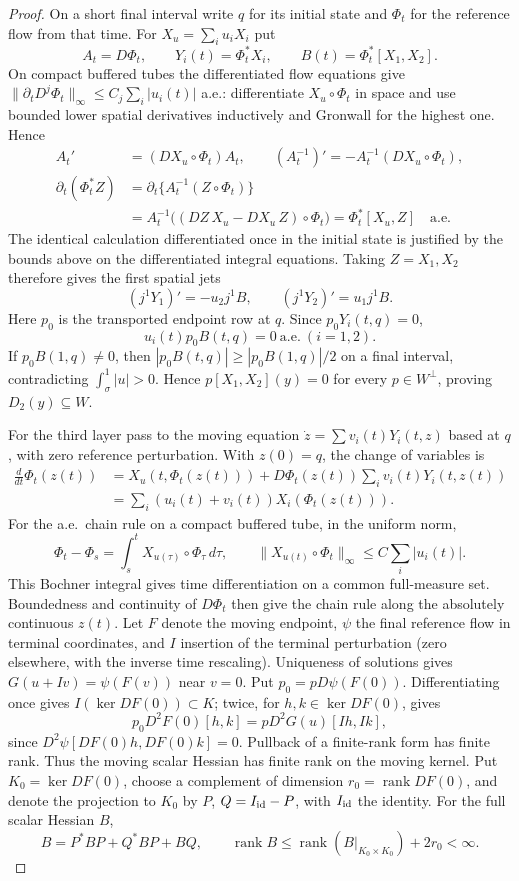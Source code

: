 \documentclass[11pt,letterpaper]{article}
\newcommand{\rank}{\operatorname{rank}}
\begin{document}
\begin{proof}
On a short final interval write $q$ for its initial state and $\Phi_t$
for the reference flow from that time. For $X_u=\sum_i u_iX_i$ put
\[
 A_t=D\Phi_t,\qquad Y_i(t)=\Phi_t^*X_i,\qquad B(t)=\Phi_t^*[X_1,X_2].
\]
On compact buffered tubes the differentiated flow equations give
$\|\partial_tD^j\Phi_t\|_\infty\le C_j\sum_i |u_i(t)|$ a.e.:
differentiate $X_u\circ\Phi_t$ in space and use bounded lower spatial
derivatives inductively and Gronwall for the highest one. Hence
\[
 \begin{aligned}
 A_t'&=(DX_u\circ\Phi_t)A_t,\qquad (A_t^{-1})'=-A_t^{-1}(DX_u\circ\Phi_t),\\
 \partial_t(\Phi_t^*Z)&=\partial_t\{A_t^{-1}(Z\circ\Phi_t)\}\\
 &=A_t^{-1}\big((DZ\,X_u-DX_u\,Z)\circ\Phi_t\big)=\Phi_t^*[X_u,Z]\quad\text{a.e.}
 \end{aligned}
\]
The identical calculation differentiated once in the initial
state is justified by the bounds above on the differentiated integral
equations. Taking $Z=X_1,X_2$ therefore gives the first spatial jets
\[
  (j^1Y_1)'=-u_2j^1 B,\qquad (j^1Y_2)'=u_1 j^1B .
\]
Here $p_0$ is the transported endpoint row at $q$. Since $p_0Y_i(t,q)=0$,
\[
 u_i(t)p_0B(t,q)=0\ \text{a.e.}\ (i=1,2).
\]
If $p_0B(1,q)\ne0$, then $|p_0B(t,q)|\ge|p_0B(1,q)|/2$ on a final
interval, contradicting $\int_\sigma^1|u|>0$. Hence
$p[X_1,X_2](y)=0$ for every $p\in W^\perp$, proving $D_2(y)\subseteq W$.

For the third layer pass to the moving equation
$\dot z=\sum v_i(t)Y_i(t,z)$ based at $q$, with zero reference perturbation.
With $z(0)=q$, the change of variables is
\[
 \begin{aligned}
 \frac d{dt}\Phi_t(z(t))
 &=X_u(t,\Phi_t(z(t)))+D\Phi_t(z(t))\sum_i v_i(t)Y_i(t,z(t))\\
 &=\sum_i(u_i(t)+v_i(t))X_i(\Phi_t(z(t))) .
 \end{aligned}
\]
For the a.e.\ chain rule on a compact buffered tube, in the uniform norm,
\[
 \Phi_t-\Phi_s=\int_s^t X_{u(\tau)}\circ\Phi_\tau\,d\tau,\qquad
 \|X_{u(t)}\circ\Phi_t\|_\infty\le C\sum_i|u_i(t)|.
\]
This Bochner integral gives time differentiation on a common full-measure
set. Boundedness and continuity of $D\Phi_t$ then give the chain rule
along the absolutely continuous $z(t)$. Let $F$ denote the moving endpoint,
$\psi$ the final reference flow in terminal coordinates, and $I$ insertion of
the terminal perturbation (zero elsewhere, with the inverse time rescaling).
Uniqueness of solutions gives $G(u+Iv)=\psi(F(v))$ near $v=0$. Put
$p_0=pD\psi(F(0))$. Differentiating once gives
$I(\ker DF(0))\subset K$; twice, for $h,k\in\ker DF(0)$, gives
\[
 p_0D^2F(0)[h,k]=pD^2G(u)[Ih,Ik],
\]
since $D^2\psi[DF(0)h,DF(0)k]=0$. Pullback of a finite-rank form
has finite rank. Thus the moving scalar Hessian has finite rank on the moving kernel.
Put $K_0=\ker DF(0)$, choose a complement of dimension
$r_0=\rank DF(0)$, and denote the projection to $K_0$ by $P$, $Q=I_{\rm id}-P$,
with $I_{\rm id}$ the identity. For the full scalar Hessian $B$,
\[
 B=P^*BP+Q^*BP+BQ,\qquad
 \rank B\le\rank(B|_{K_0\times K_0})+2r_0<\infty .
\]


\end{proof}
\end{document}
